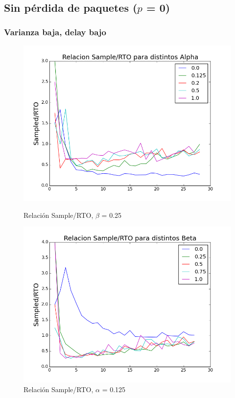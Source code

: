 \subsection{Sin pérdida de paquetes ($p$ = 0)}

\subsubsection{Varianza baja, delay bajo}

\begin{figure}[H]
\begin{minipage}{0.5\linewidth}
\includegraphics[width=\linewidth]{../graficos/alphad01var2drop0.png}
\caption{Relación Sample/RTO, $\beta$ = 0.25}\label{fig:alpha-var2-drop0}
\end{minipage}
\hfill
\begin{minipage}{0.5\linewidth}
\includegraphics[width=\linewidth]{../graficos/betad01var2drop0.png}
\caption{Relación Sample/RTO, $\alpha$ = 0.125}\label{fig:beta-var2-drop0}
\end{minipage}
\end{figure}

